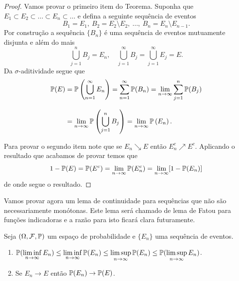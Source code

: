 \begin{proof}
Vamos provar o primeiro item do Teorema. 
Suponha que $E_1\subset E_2\subset \ldots\subset E_n\subset \ldots$
e defina a seguinte sequência de eventos 
\[
B_1= E_1,\ B_2= E_2\setminus E_2,\ \ldots,\  B_n=E_n\setminus E_{n-1}.
\]
Por construção a sequência $\{B_n\}$ é uma sequência de eventos
mutuamente disjunta e além do mais 
\[
\bigcup_{j=1}^n B_j = E_n, \quad 
\bigcup_{j=1}^{\infty} B_j = \bigcup_{j=1}^{\infty} E_j = E.
\]
Da $\sigma$-aditividade segue que 
\begin{align*}
	\P(E)
	&=
		\P\left( \bigcup_{n=1}^{\infty} E_n\right)
		=
		\sum_{n=1}^{\infty}\P(B_n)
		=
		\lim_{n\to\infty} \sum_{j=1}^n \P(B_j)
	\\[0.3cm]
	&=
		\lim_{n\to\infty}\P\left( \bigcup_{j=1}^{n} B_j\right)
		=
		\lim_{n\to\infty}\P\left( E_n\right).
\end{align*}

Para provar o segundo item note que se $E_n\searrow E$ 
então $E_n^c \nearrow E^c$. Aplicando o resultado que 
acabamos de provar temos que 
	\[
		1-\P(E)
		=
		\P(E^c)		
		=
		\lim_{n\to\infty} \P(E_n^c)
		=
		\lim_{n\to\infty} [1-\P(E_n)]		
	\]
de onde segue o resultado.
\end{proof}

Vamos provar agora um lema de continuidade para sequências 
que não são necessariamente monótonas. 
Este lema será chamado de lema de Fatou para funções indicadoras
e a razão para isto ficará clara futuramente.

\begin{lema}
Seja $(\Omega,\F,\P)$ um espaço de probabilidade e 
$\{E_n\}$ uma sequência de eventos.
\begin{enumerate}
	\item
	$\displaystyle
	\P(\liminf_{n\to\infty} E_n)
	\leq 
	\liminf_{n\to\infty} \P(E_n)
	\leq
	\limsup_{n\to\infty} \P(E_n)
	\leq
	\P(\limsup_{n\to\infty} E_n)$.
	
	\item Se $E_n\to E$ então $\P(E_n)\to \P(E)$.
\end{enumerate}
\end{lema}


